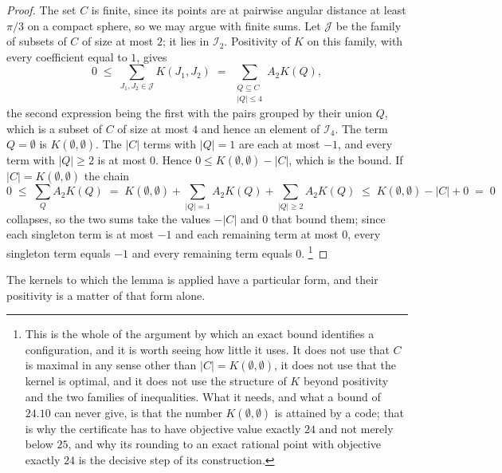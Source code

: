 \documentclass[11pt,reqno]{amsart}
\renewcommand{\_}{\origunderscore\allowbreak}
\numberwithin{equation}{section}
\theoremstyle{plain}
\theoremstyle{definition}
\theoremstyle{remark}
\begin{document}
\begin{proof}
The set $C$ is finite, since its points are at pairwise angular distance
at least $\pi/3$ on a compact sphere, so we may argue with finite
sums. Let $\mathcal J$ be the family of subsets of $C$ of size at most
$2$; it lies in $\mathcal I_2$. Positivity of $K$ on this family, with every
coefficient equal to $1$, gives
\[
  0\;\le\;\sum_{J_1,J_2\in\mathcal J}K(J_1,J_2)
  \;=\;\sum_{\substack{Q\subseteq C\\ |Q|\le4}}A_2K(Q),
\]
the second expression being the first with the pairs grouped by their
union $Q$, which is a subset of $C$ of size at most $4$ and hence an
element of $\mathcal I_4$. The term $Q=\emptyset$ is $K(\emptyset,\emptyset)$.
The $|C|$ terms with $|Q|=1$ are each at most $-1$, and every term with
$|Q|\ge2$ is at most $0$. Hence $0\le K(\emptyset,\emptyset)-|C|$, which is
the bound. If $|C|=K(\emptyset,\emptyset)$ the chain
\[
  0\;\le\;\sum_{Q}A_2K(Q)
  \;=\;K(\emptyset,\emptyset)+\sum_{|Q|=1}A_2K(Q)+\sum_{|Q|\ge2}A_2K(Q)
  \;\le\;K(\emptyset,\emptyset)-|C|+0\;=\;0
\]
collapses, so the two sums take the values $-|C|$ and $0$ that bound
them; since each singleton term is at most $-1$ and each remaining term at
most $0$, every singleton term equals $-1$ and every remaining term
equals $0$.%
\footnote{This is the whole of the argument by which an exact bound
  identifies a configuration, and it is worth seeing how little it
  uses. It does not use that $C$ is maximal in any sense other than
  $|C|=K(\emptyset,\emptyset)$, it does not use that the kernel is
  optimal, and it does not use the structure of $K$ beyond positivity
  and the two families of inequalities. What it needs, and what a
  bound of $24.10$ can never give, is that the number
  $K(\emptyset,\emptyset)$ is attained by a code; that is why the
  certificate has to have objective value exactly $24$ and not merely
  below $25$, and why its rounding to an exact rational point with
  objective exactly $24$ is the decisive step of its construction.}
\end{proof}

The kernels to which the lemma is applied have a particular form, and
their positivity is a matter of that form alone.
\end{document}
